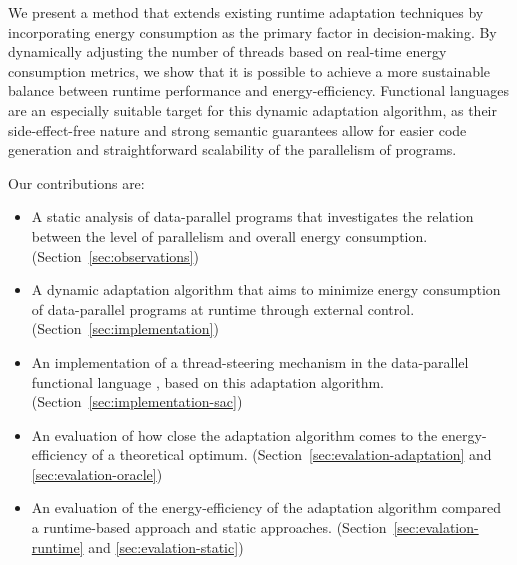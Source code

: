 We present a method that extends existing runtime adaptation techniques by incorporating energy consumption as the primary factor in decision-making.
By dynamically adjusting the number of threads based on real-time energy consumption metrics, we show that it is possible to achieve a more sustainable balance between runtime performance and energy-efficiency.
Functional languages are an especially suitable target for this dynamic adaptation algorithm, as their side-effect-free nature and strong semantic guarantees allow for easier code generation and straightforward scalability of the parallelism of programs.

Our contributions are:
\begin{itemize}
    \item A static analysis of data-parallel programs that investigates the relation between the level of parallelism and overall energy consumption.
    (Section~\ref{sec:observations})
    \item A dynamic adaptation algorithm that aims to minimize energy consumption of data-parallel programs at runtime through external control.
    (Section~\ref{sec:implementation})
    \item An implementation of a thread-steering mechanism in the data-parallel functional language \sac{}, based on this adaptation algorithm.
    (Section~\ref{sec:implementation-sac})
    \item An evaluation of how close the adaptation algorithm comes to the energy-efficiency of a theoretical optimum.
    (Section~\ref{sec:evalation-adaptation} and \ref{sec:evalation-oracle})
    \item An evaluation of the energy-efficiency of the adaptation algorithm compared a runtime-based approach and static approaches.
    (Section~\ref{sec:evalation-runtime} and \ref{sec:evalation-static})
\end{itemize}
